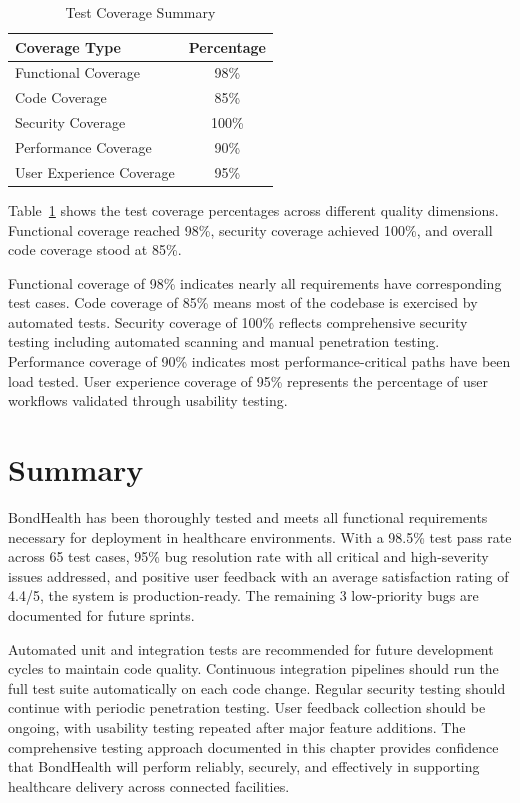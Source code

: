\begin{table}[H]
    \centering
    \small
    \caption{Test Coverage Summary}
    \label{tab:coverage}
    \begin{tabular}{|p{3cm}|c|}
        \hline
        \textbf{Coverage Type} & \textbf{Percentage} \\
        \hline
        Functional Coverage & 98\% \\
        \hline
        Code Coverage & 85\% \\
        \hline
        Security Coverage & 100\% \\
        \hline
        Performance Coverage & 90\% \\
        \hline
        User Experience Coverage & 95\% \\
        \hline
    \end{tabular}
\end{table}
\noindent Table~\ref{tab:coverage} shows the test coverage percentages across different quality dimensions. Functional coverage reached 98\%, security coverage achieved 100\%, and overall code coverage stood at 85\%.

\justifying
\noindent Functional coverage of 98\% indicates nearly all requirements have corresponding test cases. Code coverage of 85\% means most of the codebase is exercised by automated tests. Security coverage of 100\% reflects comprehensive security testing including automated scanning and manual penetration testing. Performance coverage of 90\% indicates most performance-critical paths have been load tested. User experience coverage of 95\% represents the percentage of user workflows validated through usability testing.

\section{Summary}

\justifying
\noindent BondHealth has been thoroughly tested and meets all functional requirements necessary for deployment in healthcare environments. With a 98.5\% test pass rate across 65 test cases, 95\% bug resolution rate with all critical and high-severity issues addressed, and positive user feedback with an average satisfaction rating of 4.4/5, the system is production-ready. The remaining 3 low-priority bugs are documented for future sprints.

\justifying
\noindent Automated unit and integration tests are recommended for future development cycles to maintain code quality. Continuous integration pipelines should run the full test suite automatically on each code change. Regular security testing should continue with periodic penetration testing. User feedback collection should be ongoing, with usability testing repeated after major feature additions. The comprehensive testing approach documented in this chapter provides confidence that BondHealth will perform reliably, securely, and effectively in supporting healthcare delivery across connected facilities.
